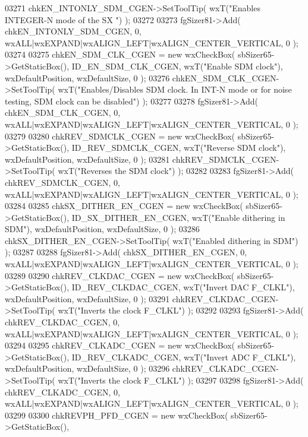 \begin{DoxyCode}
03271     chkEN_INTONLY_SDM_CGEN->SetToolTip( wxT(\textcolor{stringliteral}{"Enables INTEGER-N mode of the SX "}) );
03272     
03273     fgSizer81->Add( chkEN_INTONLY_SDM_CGEN, 0, wxALL|wxEXPAND|wxALIGN\_LEFT|wxALIGN\_CENTER\_VERTICAL, 0 );
03274     
03275     chkEN_SDM_CLK_CGEN = \textcolor{keyword}{new} wxCheckBox( sbSizer65->GetStaticBox(), 
      ID_EN_SDM_CLK_CGEN, wxT(\textcolor{stringliteral}{"Enable SDM clock"}), wxDefaultPosition, wxDefaultSize, 0 );
03276     chkEN_SDM_CLK_CGEN->SetToolTip( wxT(\textcolor{stringliteral}{"Enables/Disables SDM clock. In INT-N mode or for noise testing,
       SDM clock can be disabled"}) );
03277     
03278     fgSizer81->Add( chkEN_SDM_CLK_CGEN, 0, wxALL|wxEXPAND|wxALIGN\_LEFT|wxALIGN\_CENTER\_VERTICAL, 0 );
03279     
03280     chkREV_SDMCLK_CGEN = \textcolor{keyword}{new} wxCheckBox( sbSizer65->GetStaticBox(), 
      ID_REV_SDMCLK_CGEN, wxT(\textcolor{stringliteral}{"Reverse SDM clock"}), wxDefaultPosition, wxDefaultSize, 0 );
03281     chkREV_SDMCLK_CGEN->SetToolTip( wxT(\textcolor{stringliteral}{"Reverses the SDM clock"}) );
03282     
03283     fgSizer81->Add( chkREV_SDMCLK_CGEN, 0, wxALL|wxEXPAND|wxALIGN\_LEFT|wxALIGN\_CENTER\_VERTICAL, 0 );
03284     
03285     chkSX_DITHER_EN_CGEN = \textcolor{keyword}{new} wxCheckBox( sbSizer65->GetStaticBox(), 
      ID_SX_DITHER_EN_CGEN, wxT(\textcolor{stringliteral}{"Enable dithering in SDM"}), wxDefaultPosition, wxDefaultSize, 0 );
03286     chkSX_DITHER_EN_CGEN->SetToolTip( wxT(\textcolor{stringliteral}{"Enabled dithering in SDM"}) );
03287     
03288     fgSizer81->Add( chkSX_DITHER_EN_CGEN, 0, wxALL|wxEXPAND|wxALIGN\_LEFT|wxALIGN\_CENTER\_VERTICAL, 0 );
03289     
03290     chkREV_CLKDAC_CGEN = \textcolor{keyword}{new} wxCheckBox( sbSizer65->GetStaticBox(), 
      ID_REV_CLKDAC_CGEN, wxT(\textcolor{stringliteral}{"Invert DAC F\_CLKL"}), wxDefaultPosition, wxDefaultSize, 0 );
03291     chkREV_CLKDAC_CGEN->SetToolTip( wxT(\textcolor{stringliteral}{"Inverts the clock F\_CLKL"}) );
03292     
03293     fgSizer81->Add( chkREV_CLKDAC_CGEN, 0, wxALL|wxEXPAND|wxALIGN\_LEFT|wxALIGN\_CENTER\_VERTICAL, 0 );
03294     
03295     chkREV_CLKADC_CGEN = \textcolor{keyword}{new} wxCheckBox( sbSizer65->GetStaticBox(), 
      ID_REV_CLKADC_CGEN, wxT(\textcolor{stringliteral}{"Invert ADC F\_CLKL"}), wxDefaultPosition, wxDefaultSize, 0 );
03296     chkREV_CLKADC_CGEN->SetToolTip( wxT(\textcolor{stringliteral}{"Inverts the clock F\_CLKL"}) );
03297     
03298     fgSizer81->Add( chkREV_CLKADC_CGEN, 0, wxALL|wxEXPAND|wxALIGN\_LEFT|wxALIGN\_CENTER\_VERTICAL, 0 );
03299     
03300     chkREVPH_PFD_CGEN = \textcolor{keyword}{new} wxCheckBox( sbSizer65->GetStaticBox(), 

\end{DoxyCode}
